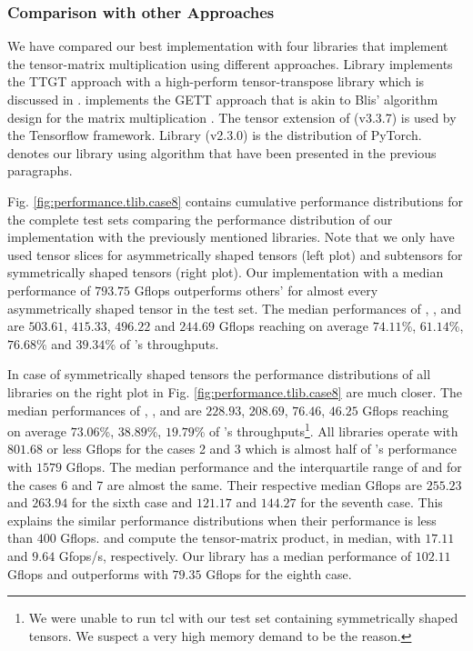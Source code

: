 \subsubsection{Comparison with other Approaches}
We have compared our best implementation with four libraries that implement the tensor-matrix multiplication using different approaches.
Library  implements the TTGT approach with a high-perform tensor-transpose library  which is discussed in \cite{springer:2018:design}.
 implements the GETT approach that is akin to Blis' algorithm design for the matrix multiplication \cite{matthews:2018:high}.
The tensor extension of  (v3.3.7) is used by the Tensorflow framework.
Library  (v2.3.0) is the  distribution of PyTorch.
 denotes our library using algorithm  that have been presented in the previous paragraphs.

Fig. \ref{fig:performance.tlib.case8} contains cumulative performance distributions for the complete test sets comparing the performance distribution of our implementation with the previously mentioned libraries.
Note that we only have used tensor slices for asymmetrically shaped tensors (left plot) and subtensors for symmetrically shaped tensors (right plot).
Our implementation with a median performance of $793.75$ Gflops outperforms others' for almost every asymmetrically shaped tensor in the test set.
The median performances of , ,  and  are $503.61$, $415.33$, $496.22$ and $244.69$ Gflops reaching on average $74.11$\%, $61.14$\%, $76.68$\% and $39.34$\% of 's throughputs.

In case of symmetrically shaped tensors the performance distributions of all libraries on the right plot in Fig. \ref{fig:performance.tlib.case8} are much closer.
The median performances of , ,  and  are $228.93$, $208.69$, $76.46$, $46.25$ Gflops reaching on average $73.06$\%, $38.89$\%, $19.79$\% of 's throughputs\footnote{We were unable to run tcl with our test set containing symmetrically shaped tensors. We suspect a very high memory demand to be the reason.}.
All libraries operate with $801.68$ or less Gflops for the cases 2 and 3 which is almost half of 's performance with $1579$ Gflops.
The median performance and the interquartile range of  and  for the cases 6 and 7 are almost the same.
Their respective median Gflops are $255.23$ and $263.94$ for the sixth case and $121.17$ and $144.27$ for the seventh case.
This explains the similar performance distributions when their performance is less than $400$ Gflops.
 and  compute the tensor-matrix product, in median, with $17.11$ and $9.64$ Gfops/s, respectively.
Our library  has a median performance of $102.11$ Gflops and outperforms  with $79.35$ Gflops for the eighth case.


